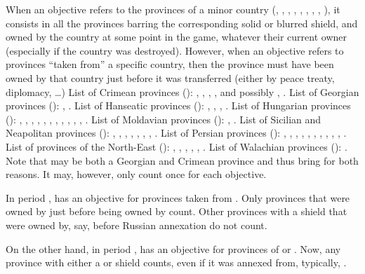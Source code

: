  When an objective refers to the provinces of a
minor country (\paysCrimee, \paysGeorgie, \paysHanse, \paysHongrie,
\paysMoldavie, \paysPerse, \paysNaples, \paysprovincesne,
\paysValachie), it consists in all the provinces barring the
corresponding solid or blurred shield, and owned by the country at some
point in the game, whatever their current owner (especially if the
country was destroyed).
\bparag However, when an objective refers to provinces ``taken from''
a specific country, then the province must have been owned by that
country just before it was transferred (either by peace treaty,
diplomacy, \ldots)
\bparag List of Crimean provinces ():
\provinceKhadzhibei, \provinceZaporozhye, \provinceCrimee,
\provinceAzov, and possibly \provinceCaffa, \provinceKuban.
\bparag List of Georgian provinces ():
\provinceGeorgie, \provinceKuban.
\bparag List of Hanseatic provinces ():
\provinceBremen, \provinceLubeck, \provinceHolstein,
\provinceMecklenburg.
\bparag List of Hungarian provinces ():
\provinceMures, \provinceErdely, \provinceBukovina, \provinceKarpatok,
\provinceSzlovakia, \provinceBalaton, \provinceCarniola,
\provinceKapela, \provinceCroatie, \provincePecs, \provinceMagyarorszag,
\provinceBanat.
\bparag List of Moldavian provinces ():
\provinceMoldova, \provinceBasarabia.
\bparag List of Sicilian and Neapolitan provinces
(): \provinceAbruzzo, \provinceCampania,
\provinceBasilicata, \provincePuglia, \provinceCalabria,
\provinceSicilia, \provincePalermo, \provinceSaldigna.
\bparag List of Persian provinces (): \provincePars,
\provinceMeshhed, \provinceBam, \provinceIsfahan, \provinceKermanshah,
\provinceAzarbayadjan, \provinceKordistan, \provinceVan,
\provinceArmenie, \provinceShirvan, \provinceDagestan.
\bparag List of provinces of the North-East ():
\provinceFriesland, \provinceGelderland, \provinceHolland,
\provinceOverijssel, \provinceUtrecht, \provinceZeeland.
\bparag List of Walachian provinces ():
\provinceValahia.
\bparag Note that \provinceKuban may be both a Georgian and Crimean
province and thus bring \VPs for both reasons. It may, however, only
count once for each objective.

\begin{exemple}
  In period , \RUS has an objective for provinces taken from
  \paysCrimee. Only provinces that were owned by \paysCrimee just before
  being owned by \RUS count. Other provinces with a 
  shield that were owned by, say, \paysUkraine before Russian annexation
  do not count.

  On the other hand, in period , \RUS has an objective for
  provinces of \paysGeorgie or \paysPerse. Now, any province with either
  a  or  shield counts, even if
  it was annexed from, typically, \TUR.
\end{exemple}

